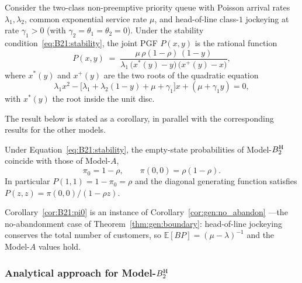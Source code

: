 \begin{theorem}\label{thm:B21:PGF}
    Consider the two-class non-preemptive priority queue with Poisson arrival rates
    $\lambda_1,\lambda_2$, common exponential service rate $\mu$, and head-of-line class-$1$
    jockeying at rate $\gamma_1>0$ (with $\gamma_2=\theta_1=\theta_2=0$). Under the stability
    condition~\eqref{eq:B21:stability}, the joint PGF $P(x,y)$ is
    the rational function
    \begin{equation}
        P(x,y) \;=\; \frac{\mu\,\rho(1-\rho)\,(1-y)}
        {\lambda_1\,\bigl(x^*(y)-y\bigr)\,\bigl(x^+(y)-x\bigr)},
        \label{eq:B21:PGF}
    \end{equation}
    where $x^*(y)$ and $x^+(y)$ are the two roots of the quadratic equation
    \begin{equation}
        \lambda_1 x^2 - \bigl[\lambda_1+\lambda_2(1-y)+\mu+\gamma_1\bigr]x + (\mu+\gamma_1 y) = 0,
        \label{eq:B21:quad}
\end{equation}
with $x^*(y)$ the root inside the unit disc.
\end{theorem}

The result below is stated as a corollary, in parallel with the corresponding results for the other models.
\begin{corollary}\label{cor:B21:pi0}
    Under Equation~\eqref{eq:B21:stability}, the empty-state probabilities of Model-$B_2^{\mathrm{H}}$ coincide with those of Model-$A$,
    \begin{equation*}
        \pi_0 = 1-\rho, \qquad \pi(0,0) = \rho(1-\rho).
    \end{equation*}
    In particular $P(1,1)=1-\pi_0=\rho$ and the diagonal generating function satisfies $P(z,z)=\pi(0,0)/(1-\rho z)$.
\end{corollary}
Corollary~\ref{cor:B21:pi0} is an instance of Corollary~\ref{cor:gen:no_abandon} ---the no-abandonment case of Theorem~\ref{thm:gen:boundary}: head-of-line jockeying conserves the total number of customers, so $\mathbb{E}[BP]=(\mu-\lambda)^{-1}$ and the Model-$A$ values hold.


\subsubsection{Analytical approach for Model-\texorpdfstring{$B_2^{\mathrm{H}}$}{B2-H}}\label{sssec:B21:analytical}

